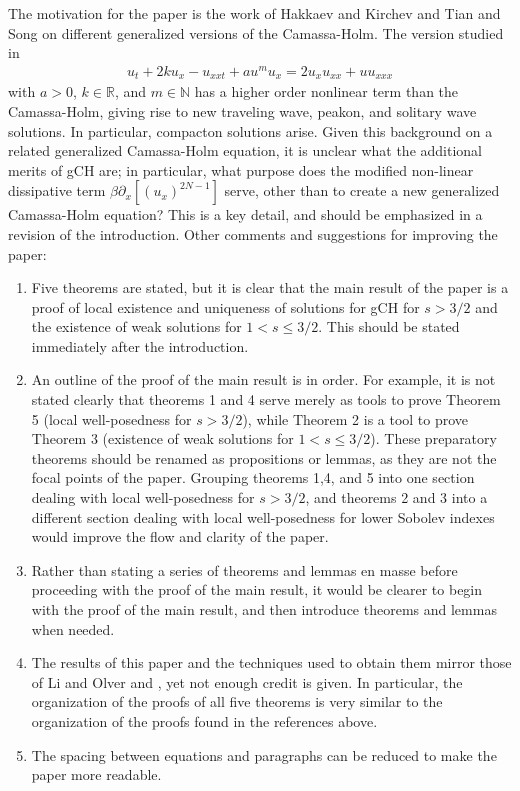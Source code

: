 \documentclass[12pt,reqno]{amsart}
\newcommand{\rr}{\mathbb{R}}
\newcommand{\p}{\partial}
\theoremstyle{plain}  %
\begin{document}
The motivation for the paper is the work
of Hakkaev and Kirchev \cite{Hakkaev_Kirchev-Local-well-pose} and 
Tian and Song \cite{Tian_Song-New-peaked-soli} on different generalized 
versions of the Camassa-Holm. The version studied in 
\cite{Tian_Song-New-peaked-soli}
%
%
\begin{equation*}
	\begin{split}
		u_t + 2ku_x -u_{xxt} + au^m u_x = 2u_x u_{xx} + u u_{xxx}
	\end{split}
\end{equation*}
%
%
with $a > 0$, $k \in \rr$, and $m \in \mathbb{N}$ has a higher order nonlinear term  
than the Camassa-Holm, giving rise to new traveling wave, peakon, and 
solitary wave solutions. In particular, compacton solutions arise. 
Given this background on a related generalized Camassa-Holm equation, it is unclear 
what the additional merits of gCH are; in particular,  
what purpose does the modified non-linear dissipative term $\beta \p_x 
[(u_x)^{2N-1}]$
serve, other than to create a new generalized Camassa-Holm equation? This 
is a key detail, and should be emphasized in a revision of the 
introduction. Other comments and suggestions for improving the paper:
%
%
\begin{enumerate}
	\item Five theorems are stated, but it is clear that the main result of 
		the paper is a proof of local existence and uniqueness of solutions 
		for gCH for $s > 3/2$ 
		and the existence of weak solutions for $1 < s \le 3/2$. This 
		should be stated immediately after the introduction. 
	\item An outline of the proof of the main result is in order.
		For example, it is not stated clearly 
		that theorems 1 and 4
		serve merely as tools to prove Theorem 5 (local well-posedness for $s 
		> 3/2$), while Theorem 2 is a tool to prove Theorem 3 (existence of weak 
		solutions for $1 < s \le 3/2$). These preparatory theorems should be 
		renamed as propositions or lemmas, as they are not the focal 
		points of the paper. Grouping theorems 1,4, and 5 into one section   
		dealing with local well-posedness for $s >3/2$, and theorems 2 and 
		3 into a different section dealing with local well-posedness for 
		lower Sobolev indexes would improve the flow and clarity of the 
		paper.
	\item Rather than stating a series of theorems and lemmas en masse 
		before proceeding with the proof of the main result, it would be 
		clearer to begin with the proof of the main result, and then 
		introduce theorems and lemmas when needed. 
	\item The results of this paper and the techniques used to obtain them
		mirror those of Li and Olver 
		\cite{Li_2000_Well-posedness-} and 
		\cite{Hakkaev_Kirchev-Local-well-pose}, 
		yet not enough credit is given. In particular, the organization of 
		the proofs of all five theorems is very similar to the organization
		of the proofs found 
		in the references above. 
	\item The spacing between equations and paragraphs can be reduced to 
		make the paper more readable.

\end{enumerate}
		



		  
				  

				  





				  
\end{document}
